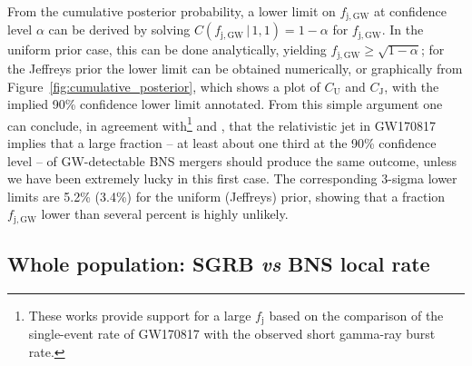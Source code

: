 \documentclass[]{aa}
\begin{document}
From the cumulative posterior probability, a lower limit on $f_\mathrm{j,GW}$ at confidence level $\alpha$ can be derived by solving $C(f_\mathrm{j,GW}\,|\,1,1)=1-\alpha$ for $f_\mathrm{j,GW}$. In the uniform prior case, this can be done analytically, yielding $f_\mathrm{j,GW}\geq \sqrt{1-\alpha}$; for the Jeffreys prior the lower limit can be obtained numerically, or graphically from Figure~\ref{fig:cumulative_posterior}, which shows a plot of $C_\mathrm{U}$ and $C_\mathrm{J}$, with the implied 90\% confidence lower limit annotated. From this simple argument one can conclude, in agreement with\footnote{These works provide support for a large $f_\mathrm{j}$ based on the comparison of the single-event rate of GW170817 with the observed short gamma-ray burst rate.} \cite{Beniamini2019} and \cite{Ghirlanda2019}, that the relativistic jet in GW170817 implies that a large fraction -- at least about one third at the 90\% confidence level -- of GW-detectable BNS mergers should produce the same outcome, unless we have been extremely lucky in this first case. The corresponding 3-sigma lower limits are 5.2\% (3.4\%) for the uniform (Jeffreys) prior, showing that a fraction $f_\mathrm{j,GW}$ lower than several percent is highly unlikely. 
\label{sec:f_jet_min}

\subsection{Whole population: SGRB \textit{vs} BNS local rate}\label{sec:fj_from_R0}
\end{document}

